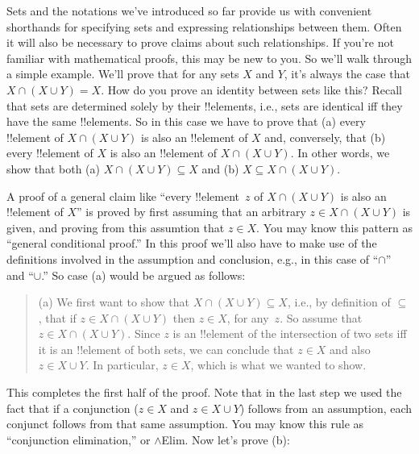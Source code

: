 \documentclass[../../../include/open-logic-section]{subfiles}
\begin{document}

\begin{explain}
Sets and the notations we've introduced so far provide us with
convenient shorthands for specifying sets and expressing relationships
between them. Often it will also be necessary to prove claims about
such relationships. If you're not familiar with mathematical proofs,
this may be new to you. So we'll walk through a simple example. We'll
prove that for any sets $X$ and $Y$, it's always the case that $X \cap
(X \cup Y) = X$. How do you prove an identity between sets like this?
Recall that sets are determined solely by their !!{element}s, i.e.,
sets are identical iff they have the same !!{element}s. So in this
case we have to prove that (a) every !!{element} of $X \cap (X \cup
Y)$ is also an !!{element} of $X$ and, conversely, that (b) every
!!{element} of $X$ is also an !!{element} of $X \cap (X \cup Y)$. In
other words, we show that both (a) $X \cap (X \cup Y) \subseteq X$ and
(b) $X \subseteq X \cap (X \cup Y)$.

A proof of a general claim like ``every !!{element}~$z$ of $X \cap (X
\cup Y)$ is also an !!{element} of $X$'' is proved by first assuming
that an arbitrary $z \in X \cap (X \cup Y)$ is given, and proving from
this assumtion that $z \in X$. You may know this pattern as ``general
conditional proof.''  In this proof we'll also have to make use of the
definitions involved in the assumption and conclusion, e.g., in this
case of ``$\cap$'' and ``$\cup$.''  So case (a) would be argued as
follows:

\begin{quote}
(a) We first want to show that $X \cap (X \cup Y) \subseteq X$, i.e.,
by definition of $\subseteq$, that if $z \in X \cap (X \cup Y)$ then
$z \in X$, for any~$z$. So assume that $z \in X \cap (X \cup
Y)$. Since $z$ is an !!{element} of the intersection of two sets iff
it is an !!{element} of both sets, we can conclude that $z \in X$ and
also $z \in X \cup Y$. In particular, $z \in X$, which is what
we wanted to show.
\end{quote}

This completes the first half of the proof. Note that in the last
step we used the fact that if a conjunction ($z \in X$ and $z \in X
\cup Y$) follows from an assumption, each conjunct follows from that
same assumption. You may know this rule as ``conjunction
elimination,'' or $\land$Elim. Now let's prove (b):


\end{explain}
\end{document}
